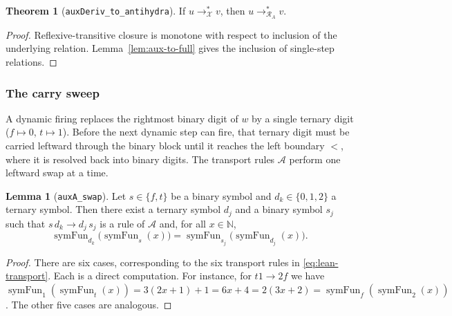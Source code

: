 \documentclass[11pt,a4paper]{article}
\theoremstyle{definition}
\newtheorem{lemma}[definition]{Lemma}
\newtheorem{theorem}[definition]{Theorem}
\newcommand{\lt}{<}
\newcommand{\Nat}{\mathbb{N}}
\newcommand{\symfun}{\operatorname{symFun}}
\newcommand{\auxA}{\mathcal{A}}
\newcommand{\auxRules}{\mathcal{X}}
\newcommand{\antihydraSRS}{\mathcal{R}_{A}}
\begin{document}
\begin{theorem}[\texttt{auxDeriv\_to\_antihydra}]
\label{thm:aux-deriv-to-full}
If $u\to^{*}_{\auxRules}v$, then $u\to^{*}_{\antihydraSRS}v$.
\end{theorem}
\begin{proof}
Reflexive-transitive closure is monotone with respect to inclusion of the
underlying relation.  Lemma~\ref{lem:aux-to-full} gives the inclusion of
single-step relations.
\end{proof}

\subsubsection{The carry sweep}

A dynamic firing replaces the rightmost binary digit of $w$ by a single
ternary digit ($f\mapsto0$, $t\mapsto1$).  Before the next dynamic step
can fire, that ternary digit must be carried leftward through the binary
block until it reaches the left boundary $\lt$, where it is resolved back
into binary digits.  The transport rules $\auxA$ perform one leftward
swap at a time.

\begin{lemma}[\texttt{auxA\_swap}]
\label{lem:auxa-swap}
Let $s\in\{f,t\}$ be a binary symbol and $d_k\in\{0,1,2\}$ a ternary
symbol.  Then there exist a ternary symbol $d_j$ and a binary symbol
$s_j$ such that $s\,d_k\to d_j\,s_j$ is a rule of $\auxA$ and, for all
$x\in\Nat$,
\[
  \symfun_{d_k}\bigl(\symfun_s(x)\bigr)
  =
  \symfun_{s_j}\bigl(\symfun_{d_j}(x)\bigr).
\]
\end{lemma}
\begin{proof}
There are six cases, corresponding to the six transport rules in
\eqref{eq:lean-transport}.  Each is a direct computation.  For instance,
for $t1\to2f$ we have
$\symfun_1(\symfun_t(x))=3(2x+1)+1=6x+4=2(3x+2)=\symfun_f(\symfun_2(x))$.
The other five cases are analogous.
\end{proof}
\end{document}
